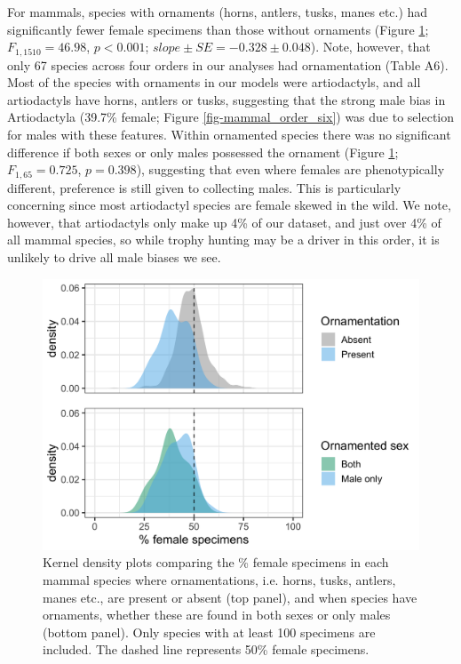 \documentclass[a4paper, 12pt]{article}
\begin{document}
For mammals, species with ornaments (horns, antlers, tusks, manes etc.) had significantly fewer female specimens than those without ornaments (Figure \ref{fig-orn}; $F_{1, 1510} = 46.98$, $p < 0.001$; $slope \pm SE = -0.328 \pm 0.048$). 
Note, however, that only 67 species across four orders in our analyses had ornamentation (Table A6).
Most of the species with ornaments in our models were artiodactyls, and all artiodactyls have horns, antlers or tusks, suggesting that the strong male bias in Artiodactyla (39.7\% female; Figure \ref{fig-mammal_order_six}) was due to selection for males with these features. 
Within ornamented species there was no significant difference if both sexes or only males possessed the ornament (Figure \ref{fig-orn}; $F_{1, 65} = 0.725$, $p = 0.398$), suggesting that even where females are phenotypically different, preference is still given to collecting males. 
This is particularly concerning since most artiodactyl species are female skewed in the wild\cite{berger1999sex}. 
We note, however, that artiodactyls only make up 4\% of our dataset, and just over 4\% of all mammal species\cite{wilson2005mammal}, so while trophy hunting may be a driver in this order, it is unlikely to drive all male biases we see.

\begin{figure}
 \centering
  \includegraphics[width = \linewidth]{figures/ornamentation.png}
  \caption{Kernel density plots comparing the \% female specimens in each mammal species where ornamentations, i.e. horns, tusks, antlers, manes etc., are present or absent (top panel), and when species have ornaments, whether these are found in both sexes or only males (bottom panel). 
  Only species with at least 100 specimens are included. 
  The dashed line represents 50\% female specimens. 
}
  \label{fig-orn}
\end{figure}
\end{document}
